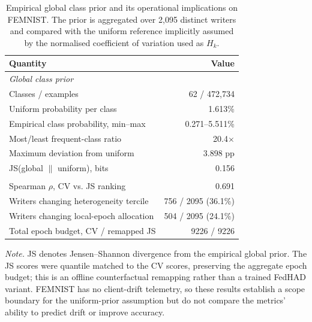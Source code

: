 \begin{table}[t]
\centering
\caption{Empirical global class prior and its operational implications on FEMNIST. The prior is aggregated over 2{,}095 distinct writers and compared with the uniform reference implicitly assumed by the normalised coefficient of variation used as $H_k$.}
\label{tab:femnist-global-prior}
\begin{tabular}{lr}
\toprule
Quantity & Value \\
\midrule
\multicolumn{2}{l}{\emph{Global class prior}} \\
Classes / examples & 62 / 472{,}734 \\
Uniform probability per class & 1.613\% \\
Empirical class probability, min--max & 0.271--5.511\% \\
Most/least frequent-class ratio & 20.4$\times$ \\
Maximum deviation from uniform & 3.898 pp \\
JS(global $\parallel$ uniform), bits & 0.156 \\
\addlinespace
\multicolumn{2}{l}{\emph{Metric disagreement over writers}} \\
Spearman $\rho$, CV vs. JS ranking & 0.691 \\
Writers changing heterogeneity tercile & 756 / 2095 (36.1\%) \\
Writers changing local-epoch allocation & 504 / 2095 (24.1\%) \\
Total epoch budget, CV / remapped JS & 9226 / 9226 \\
\bottomrule
\end{tabular}
\vspace{2pt}
{\footnotesize\raggedright \textit{Note.} JS denotes Jensen--Shannon divergence from the empirical global prior. The JS scores were quantile matched to the CV scores, preserving the aggregate epoch budget; this is an offline counterfactual remapping rather than a trained FedHAD variant. FEMNIST has no client-drift telemetry, so these results establish a scope boundary for the uniform-prior assumption but do not compare the metrics' ability to predict drift or improve accuracy.\par}
\end{table}
